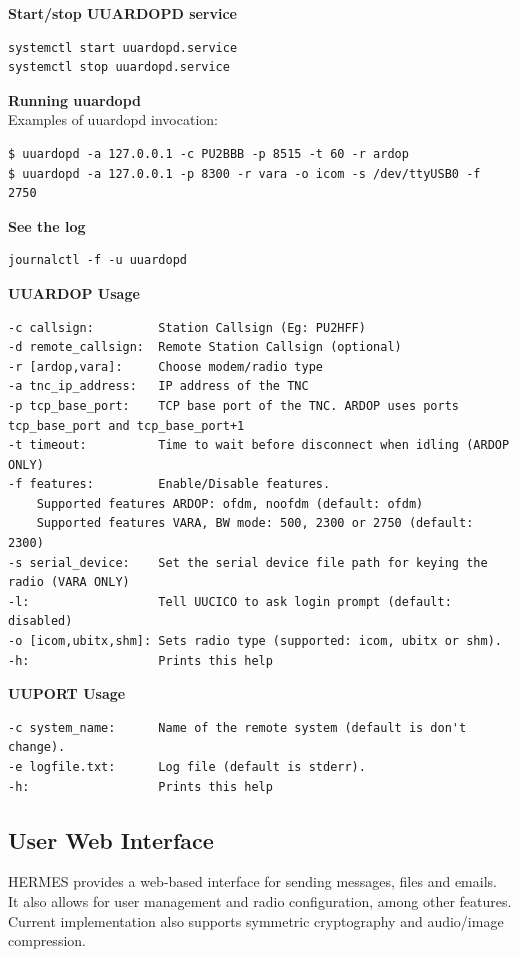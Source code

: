 \documentclass[11pt,a4paper]{article}
\begin{document}
\textbf{Start/stop UUARDOPD service}
\begin{verbatim}
systemctl start uuardopd.service
systemctl stop uuardopd.service
\end{verbatim}

\textbf{Running uuardopd}\\

Examples of uuardopd invocation:

\begin{verbatim}
$ uuardopd -a 127.0.0.1 -c PU2BBB -p 8515 -t 60 -r ardop
$ uuardopd -a 127.0.0.1 -p 8300 -r vara -o icom -s /dev/ttyUSB0 -f 2750  
\end{verbatim}


\textbf{See the log}
\begin{verbatim}
journalctl -f -u uuardopd
\end{verbatim}

\textbf{UUARDOP Usage}
\begin{verbatim}
-c callsign:         Station Callsign (Eg: PU2HFF)
-d remote_callsign:  Remote Station Callsign (optional)
-r [ardop,vara]:     Choose modem/radio type
-a tnc_ip_address:   IP address of the TNC
-p tcp_base_port:    TCP base port of the TNC. ARDOP uses ports tcp_base_port and tcp_base_port+1
-t timeout:          Time to wait before disconnect when idling (ARDOP ONLY)
-f features:         Enable/Disable features.
    Supported features ARDOP: ofdm, noofdm (default: ofdm)
    Supported features VARA, BW mode: 500, 2300 or 2750 (default: 2300)
-s serial_device:    Set the serial device file path for keying the radio (VARA ONLY)
-l:                  Tell UUCICO to ask login prompt (default: disabled)
-o [icom,ubitx,shm]: Sets radio type (supported: icom, ubitx or shm).
-h:                  Prints this help
\end{verbatim}

\textbf{UUPORT Usage}
\begin{verbatim}
-c system_name:      Name of the remote system (default is don't change).
-e logfile.txt:      Log file (default is stderr).
-h:                  Prints this help
\end{verbatim}
\subsection{User Web Interface}

HERMES provides a web-based interface for sending messages, files and emails. It also allows for user management and radio configuration, among other features.
Current implementation also supports symmetric cryptography and audio/image compression.
\end{document}
